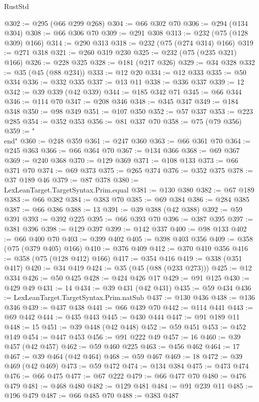 \begin{lexlean}{RustStd}
\begin{coremodule}
{\begin{coremodule}
{{{{{{{{{{{{{{{{{{{{{{{{{{{{{{{{{{{{{{{{{{{@302 := @295 (@66 @299 @268)
@304 := @66 @302 @70
@306 := @294 (@134 @304)
@308 := @66 @306 @70
@309 := @291 @308
@313 := @232 (@75 (@128 @309) @166)
@314 := @290 @313
@318 := @232 (@75 (@274 @314) @166)
@319 := @271 @318
@321 := @260 @319 @230
@325 := @232 (@75 (@235 @321) @166)
@326 := @228 @325
@328 := @181 (@217 @326)
@329 := @34 @328
@332 := @35 (@45 (@88 @234))
@333 := @12 @20
@334 := @12 @333
@335 := @50 @334
@336 := @332 @335
@337 := @13 @11
@338 := @336 @337
@339 := 12
@342 := @39 @339 (@42 @339)
@344 := @185 @342 @71
@345 := @66 @344
@346 := @114 @70
@347 := @208 @346
@348 := @345 @347
@349 := @184 @348
@350 := @98 @349
@351 := @107 @350
@352 := @57 @337
@353 := @223 @285
@354 := @352 @353
@356 := @81 @337 @70
@358 := @75 (@79 @356)
@359 := "\\end"
@360 := @248 @359
@361 := @247 @360
@363 := @66 @361 @70
@364 := @245 @363
@366 := @66 @364 @70
@367 := @134 @366
@368 := @69 @367
@369 := @240 @368
@370 := @129 @369
@371 := @108 @133
@373 := @66 @371 @70
@374 := @69 @373
@375 := @265 @374
@376 := @352 @375
@378 := @37 @189 @46
@379 := @87 @378
@380 := LexLeanTarget.TargetSyntax.Prim.equal
@381 := @130 @380
@382 := @67 @189
@383 := @66 @382
@384 := @383 @70
@385 := @69 @384
@386 := @284 @385
@387 := @66 @386
@388 := 13
@391 := @39 @388 (@42 @388)
@392 := @59 @391
@393 := @392 @225
@395 := @66 @393 @70
@396 := @387 @395
@397 := @381 @396
@398 := @129 @397
@399 := @142 @337
@400 := @98 @133
@402 := @66 @400 @70
@403 := @399 @402
@405 := @398 @403 @356
@409 := @358 (@75 (@379 @405) @166)
@410 := @376 @409
@412 := @370 @410 @356
@416 := @358 (@75 (@128 @412) @166)
@417 := @354 @416
@419 := @338 (@351 @417)
@420 := @34 @419
@424 := @35 (@45 (@88 (@233 @273)))
@425 := @12 @334
@426 := @50 @425
@428 := @424 @426 @17
@429 := @91 @125
@430 := @429 @49
@431 := 14
@434 := @39 @431 (@42 @431)
@435 := @59 @434
@436 := LexLeanTarget.TargetSyntax.Prim.natSub
@437 := @130 @436
@438 := @136 @346
@439 := @437 @438
@441 := @66 @439 @70
@442 := @114 @441
@443 := @69 @442
@444 := @435 @443
@445 := @430 @444
@447 := @91 @189 @11
@448 := 15
@451 := @39 @448 (@42 @448)
@452 := @59 @451
@453 := @452 @149
@454 := @447 @453
@456 := @91 @222 @49
@457 := 16
@460 := @39 @457 (@42 @457)
@462 := @59 @460 @225
@463 := @456 @462
@464 := 17
@467 := @39 @464 (@42 @464)
@468 := @59 @467
@469 := 18
@472 := @39 @469 (@42 @469)
@473 := @59 @472
@474 := @134 @384
@475 := @473 @474
@476 := @66 @475
@477 := @67 @222
@479 := @66 @477 @70
@480 := @476 @479
@481 := @468 @480
@482 := @129 @481
@484 := @91 @239 @11
@485 := @196 @479
@487 := @66 @485 @70
@488 := @383 @487
}}}}}}}}}}}}}}}}}}}}}}}}}}}}}}}}}}}}}}}}}}}
\end{coremodule}}
\end{coremodule}
\end{lexlean}

